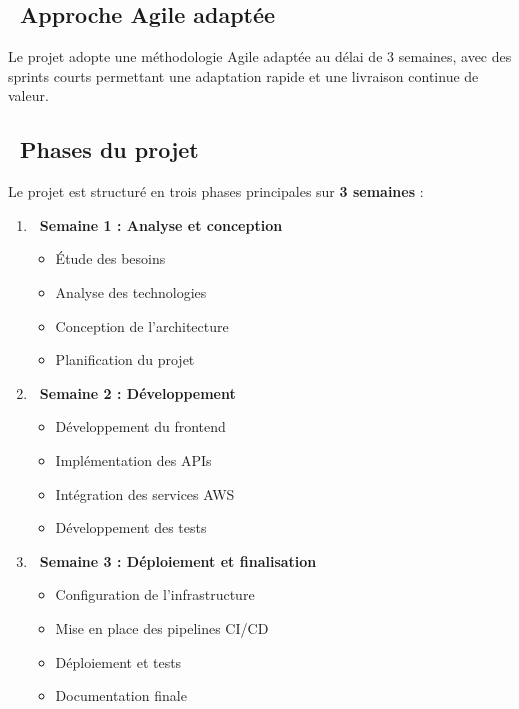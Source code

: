 \subsection{\faAgile\ Approche Agile adaptée}

\begin{infobox}[Méthodologie]
Le projet adopte une méthodologie Agile adaptée au délai de 3 semaines, avec des sprints courts permettant une adaptation rapide et une livraison continue de valeur.
\end{infobox}

\subsection{\faCalendarWeek\ Phases du projet}

Le projet est structuré en trois phases principales sur \textbf{\color{primaryblue}3 semaines} :

\begin{enumerate}
    \item \textbf{\color{accentgreen}\faWeek\ Semaine 1 : Analyse et conception}
    \begin{itemize}
        \item Étude des besoins
        \item Analyse des technologies
        \item Conception de l'architecture
        \item Planification du projet
    \end{itemize}
    
    \item \textbf{\color{accentgreen}\faWeek\ Semaine 2 : Développement}
    \begin{itemize}
        \item Développement du frontend
        \item Implémentation des APIs
        \item Intégration des services AWS
        \item Développement des tests
    \end{itemize}
    
    \item \textbf{\color{accentgreen}\faWeek\ Semaine 3 : Déploiement et finalisation}
    \begin{itemize}
        \item Configuration de l'infrastructure
        \item Mise en place des pipelines CI/CD
        \item Déploiement et tests
        \item Documentation finale
    \end{itemize}
\end{enumerate}


